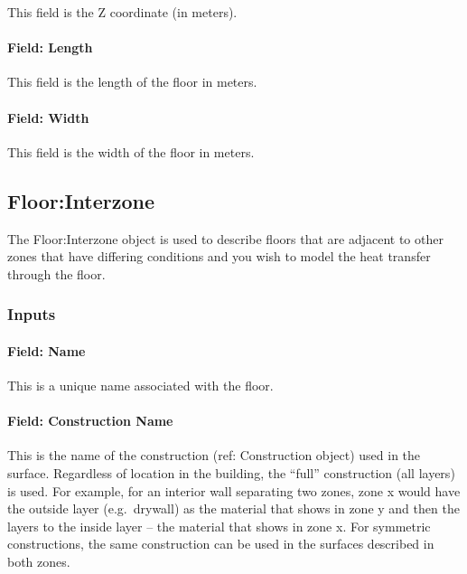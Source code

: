 This field is the Z coordinate (in meters).

\paragraph{Field: Length}\label{field-length-8}

This field is the length of the floor in meters.

\paragraph{Field: Width}\label{field-width-4}

This field is the width of the floor in meters.

\subsection{Floor:Interzone}\label{floorinterzone}

The Floor:Interzone object is used to describe floors that are adjacent to other zones that have differing conditions and you wish to model the heat transfer through the floor.

\subsubsection{Inputs}\label{inputs-13-016}

\paragraph{Field: Name}\label{field-name-9-019}

This is a unique name associated with the floor.

\paragraph{Field: Construction Name}\label{field-construction-name-9}

This is the name of the construction (ref: Construction object) used in the surface. Regardless of location in the building, the ``full'' construction (all layers) is used. For example, for an interior wall separating two zones, zone x would have the outside layer (e.g.~drywall) as the material that shows in zone y and then the layers to the inside layer -- the material that shows in zone x. For symmetric constructions, the same construction can be used in the surfaces described in both zones.


